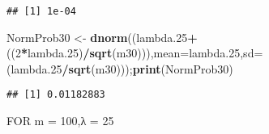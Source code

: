 \documentclass[
]{article}
\newenvironment{Shaded}{\begin{snugshade}}{\end{snugshade}}
\newcommand{\DataTypeTok}[1]{\textcolor[rgb]{0.13,0.29,0.53}{#1}}
\newcommand{\DecValTok}[1]{\textcolor[rgb]{0.00,0.00,0.81}{#1}}
\newcommand{\FloatTok}[1]{\textcolor[rgb]{0.00,0.00,0.81}{#1}}
\newcommand{\KeywordTok}[1]{\textcolor[rgb]{0.13,0.29,0.53}{\textbf{#1}}}
\newcommand{\NormalTok}[1]{#1}
\newcommand{\OperatorTok}[1]{\textcolor[rgb]{0.81,0.36,0.00}{\textbf{#1}}}
\newcommand{\StringTok}[1]{\textcolor[rgb]{0.31,0.60,0.02}{#1}}
\begin{document}
\begin{verbatim}
## [1] 1e-04
\end{verbatim}

\begin{Shaded}
\begin{Highlighting}[]
\NormalTok{NormProb30 <-}\StringTok{ }\KeywordTok{dnorm}\NormalTok{((lambda}\FloatTok{.25}\OperatorTok{+}\NormalTok{((}\DecValTok{2}\OperatorTok{*}\NormalTok{lambda}\FloatTok{.25}\NormalTok{)}\OperatorTok{/}\KeywordTok{sqrt}\NormalTok{(m30))),}\DataTypeTok{mean=}\NormalTok{lambda}\FloatTok{.25}\NormalTok{,}\DataTypeTok{sd=}\NormalTok{(lambda}\FloatTok{.25}\OperatorTok{/}\KeywordTok{sqrt}\NormalTok{(m30)));}\KeywordTok{print}\NormalTok{(NormProb30)}
\end{Highlighting}
\end{Shaded}

\begin{verbatim}
## [1] 0.01182883
\end{verbatim}

FOR m = 100,λ = 25
\end{document}
